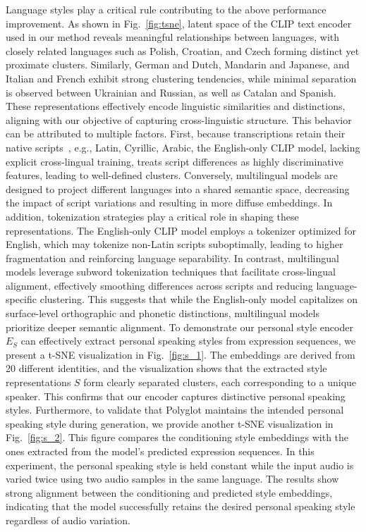 \documentclass[a4paper, 10pt, conference]{ieeeconf}      %
\begin{document}
Language styles play a critical rule contributing to the above performance improvement.
As shown in Fig.~\ref{fig:tsne}, latent space of the CLIP text encoder~\cite{clip} used in our method reveals meaningful relationships between languages, with closely related languages such as Polish, Croatian, and Czech forming distinct yet proximate clusters. Similarly, German and Dutch, Mandarin and Japanese, and Italian and French exhibit strong clustering tendencies, while minimal separation is observed between Ukrainian and Russian, as well as Catalan and Spanish. These representations effectively encode linguistic similarities and distinctions, aligning with our objective of capturing cross-linguistic structure.
This behavior can be attributed to multiple factors. First, because transcriptions retain their native scripts~\cite{radford2021learningtransferablevisualmodels}, e.g., Latin, Cyrillic, Arabic, the English-only CLIP model, lacking explicit cross-lingual training, treats script differences as highly discriminative features, leading to well-defined clusters. Conversely, multilingual models are designed to project different languages into a shared semantic space, decreasing the impact of script variations and resulting in more diffuse embeddings.
In addition, tokenization strategies play a critical role in shaping these representations. The English-only CLIP model employs a tokenizer optimized for English, which may tokenize non-Latin scripts suboptimally, leading to higher fragmentation and reinforcing language separability. In contrast, multilingual models leverage subword tokenization techniques that facilitate cross-lingual alignment, effectively smoothing differences across scripts and reducing language-specific clustering. This suggests that while the English-only model capitalizes on surface-level orthographic and phonetic distinctions, multilingual models prioritize deeper semantic alignment. 
To demonstrate our personal style encoder \(E_S\) can effectively extract personal speaking styles from expression sequences, we present a t-SNE visualization in Fig.~\ref{fig:s_1}. The embeddings are derived from 20 different identities, and the visualization shows that the extracted style representations \(S\) form clearly separated clusters, each corresponding to a unique speaker. This confirms that our encoder captures distinctive personal speaking styles.
Furthermore, to validate that Polyglot maintains the intended personal speaking style during generation, we provide another t-SNE visualization in Fig.~\ref{fig:s_2}. This figure compares the conditioning style embeddings with the ones extracted from the model’s predicted expression sequences. In this experiment, the personal speaking style is held constant while the input audio is varied twice using two audio samples in the same language. The results show strong alignment between the conditioning and predicted style embeddings, indicating that the model successfully retains the desired personal speaking style regardless of audio variation. 
\end{document}
